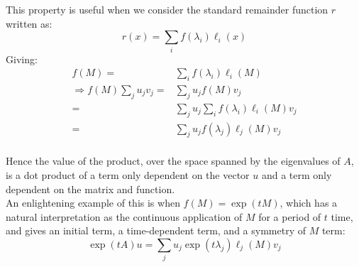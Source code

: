 This property is useful when we consider the standard remainder function $r$ written as:
\[r(x) = \sum_if(\lambda_i)\ell_i(x)\]
Giving:
\begin{equation*}
\begin{aligned}
	f(M) =& \sum_if(\lambda_i)\ell_i(M)\\
	\Rightarrow f(M)\sum_ju_jv_j =& \sum_ju_jf(M)v_j \\
	=& \sum_ju_j\sum_if(\lambda_i)\ell_i(M)v_j\\
	=& \sum_ju_jf(\lambda_j)\ell_j(M)v_j\\
\end{aligned}
\end{equation*}

Hence the value of the product,
over the space spanned by the eigenvalues of $A$,
is a dot product of a term only dependent on the vector $u$ and a term only dependent on the matrix and function.
\\

An enlightening example of this is when $f(M)=\exp(tM)$,
which has a natural interpretation as the continuous application of $M$ for a period of $t$ time,
and gives an initial term,
a time-dependent term,
and a symmetry of $M$ term:
\[\exp(tA)u = \sum_ju_j\exp(t\lambda_j)\ell_j(M)v_j\]
